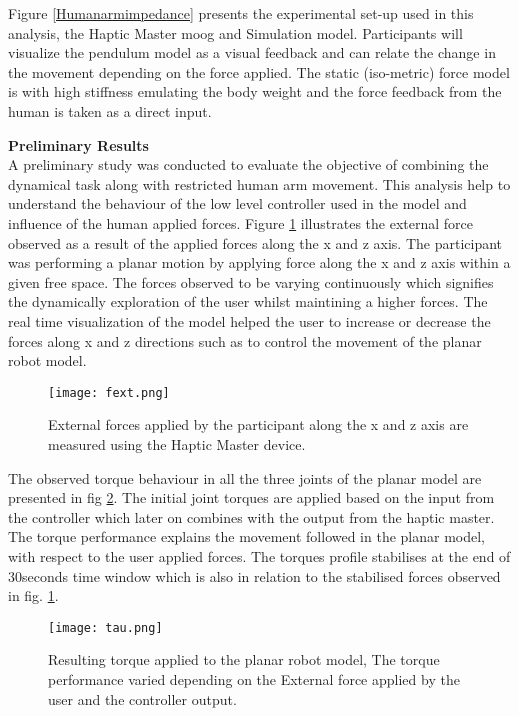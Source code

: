 Figure {\ref{Humanarmimpedance}} presents the experimental set-up used in this analysis, the Haptic Master moog and Simulation model. Participants will visualize the pendulum model as a visual feedback and can relate the change in the movement depending on the force applied. The static (iso-metric) force model is with high stiffness emulating the body weight and the force feedback from the human is taken as a direct input. 

\textbf{Preliminary Results}\\
A preliminary study was conducted to evaluate the objective of combining the dynamical task along with restricted human arm movement. This analysis help to understand the behaviour of the low level controller used in the model and influence of the human applied forces. Figure {\ref{externalforce}} illustrates the external force observed as a result of the applied forces along the x and z axis. The participant was performing a planar motion by applying force along the x and z axis within a given free space. The forces observed to be varying continuously which signifies the dynamically exploration of the user whilst maintining a higher forces. The real time visualization of the model helped the user to increase or decrease the forces along x and z directions such as to control the movement of the planar robot model.
\begin{figure}[h!]
\centering
\texttt{[image: fext.png]}
\caption{ External forces applied by the participant along the x and z axis are measured using the Haptic Master device.}
\label{externalforce}
\end{figure}

The observed torque behaviour in all the three joints of the planar model are presented in fig {\ref{torque}}. The initial joint torques are applied based on the input from the controller which later on combines with the output from the haptic master. The torque performance explains the movement followed in the planar model, with respect to the user applied forces. The torques profile stabilises at the end of 30seconds time window which is also in relation to the stabilised forces observed in fig. {\ref{externalforce}}.  
\begin{figure}[h!]
\centering
\texttt{[image: tau.png]}
\caption{Resulting torque applied to the planar robot model, The torque performance varied depending on the External force applied by the user and the controller output.}
\label{torque}
\end{figure}

